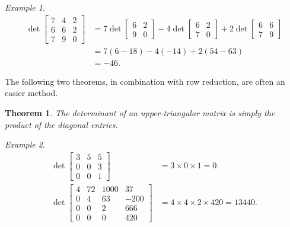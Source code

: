 \documentclass[10pt, a4paper]{amsart}
\newtheorem{thm}{Theorem}
\theoremstyle{definition}
\theoremstyle{remark}
\newtheorem{ex}{Example}
\begin{document}
\begin{ex}
  \begin{align*}
    \det \begin{bmatrix} 7 & 4 & 2 \\ 6 & 6 & 2 \\ 7 & 9 & 0 \end{bmatrix}
      &= 7 \det \begin{bmatrix} 6 & 2 \\ 9 & 0 \end{bmatrix} - 4 \det \begin{bmatrix} 6 & 2 \\ 7 & 0 \end{bmatrix}
       + 2 \det \begin{bmatrix} 6 & 6 \\ 7 & 9 \end{bmatrix}\\
      &= 7(6-18) - 4(-14) + 2(54-63)\\
      &= -46.
  \end{align*}
\end{ex}

The following two theorems, in combination with row reduction, are often an easier method.

\begin{thm}
  The determinant of an upper-triangular matrix is simply the product of the diagonal entries.
\end{thm}

\begin{ex}
  \begin{align*}
    \det \begin{bmatrix} 3 & 5 & 5 \\ 0 & 0 & 3 \\ 0 & 0 & 1 \end{bmatrix} &= 3 \times 0 \times 1 = 0.\\
    \det \begin{bmatrix} 4 & 72 & 1000 & 37 \\ 0 & 4 & 63 & -200 \\ 0 & 0 & 2 & 666 \\ 0 & 0 & 0 & 420 \end{bmatrix} &= 4 \times 4 \times 2 \times 420 = 13440.
  \end{align*}
\end{ex}
\end{document}

